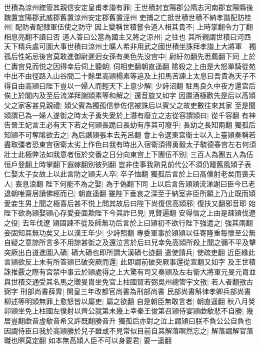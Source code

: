 世積為涼州緫管其親信安定皇甫孝諧有罪|{
	王世積封宜陽郡公隋志河南郡宜陽縣後魏置宜陽郡武威郡舊置涼州安定郡舊置涇州}
吏捕之亡抵世積世積不納孝諧配防桂州|{
	配防者配隸軍伍使之防守}
因上變稱世積嘗令道人相其貴不|{
	上時掌翻令力丁翻相息亮翻不讀曰否}
道人答曰公當為國主又將之涼州|{
	之往也}
其所親謂世積曰河西天下精兵處可圖大事世積曰涼州土曠人希非用武之國世積坐誅拜孝諧上大將軍　獨孤后性妬忌後宫莫敢進御尉遲迥女孫有美色先没宫中|{
	尉紆勿翻先悉薦翻下同}
上於仁夀宫見而悦之因得幸后伺上聽朝|{
	伺相吏翻朝直遥翻}
隂殺之上由是大怒單騎從苑中出不由徑路入山谷間二十餘里高熲楊素等追及上扣馬苦諫上太息曰吾貴為天子不得自由高熲曰陛下豈以一婦人而輕天下上意少解|{
	少詩沼翻}
駐馬良久中夜方還宫后俟上於閣内及至后流涕拜謝熲素等和解之|{
	還音旋又如字}
因置酒極歡先是后以高熲父之家客甚見親禮|{
	熲父賓為獨孤信參佐信被誅后以賓父之故吏數往來其家}
至是聞熲謂已為一婦人遂衘之時太子勇失愛於上潛有廢立之志從容謂熲曰|{
	從千容翻}
有神告晉王妃言王必有天下若之何熲長跪曰長幼有序其可廢乎|{
	長幼之長知兩翻}
獨孤后知熲不可奪隂欲去之|{
	為后譖熲張本去羌呂翻}
會上令選東宫衛士以入上臺熲奏稱若盡取彊者恐東宫宿衛太劣上作色曰我有時出入宿衛須得勇毅太子毓德春宫左右何須壯士此極弊法如我意者恒於交番之日分向東宫上下團伍不别|{
	三百人為團五人為伍恒戶登翻上時掌翻下遐嫁翻别彼列翻}
豈非佳事我熟見前代公不須仍踵舊風熲子表仁娶太子女故上以此言防之熲夫人卒|{
	卒子恤翻}
獨孤后言於上曰高僕射老矣而喪夫人|{
	喪息浪翻}
陛下何能不為之娶|{
	為于偽翻下同}
上以后言告熲熲流涕謝曰臣今已老退朝唯齋居讀佛經而已|{
	朝直遥翻}
雖陛下垂哀之深至于納室非臣所願上乃止既而熲愛妾生男上聞之極喜后甚不悦上問其故后曰陛下尚復信高熲邪|{
	復扶又翻邪音耶}
始陛下欲為熲娶熲心存愛妾面欺陛下今其詐已見|{
	見賢遍翻}
安得信之上由是疎熲伐遼之役|{
	去年伐遼}
熲固諫不從及師無功后言於上曰熲初不欲行陛下強遣之|{
	強其兩翻}
妾固知其無功矣又上以漢王年少|{
	少詩照翻}
專委軍事於熲熲以任寄隆重每懷至公無自疑之意諒所言多不用諒甚衘之及還泣言於后曰兒幸免高熲所殺上聞之彌不平及擊突厥出白道進圖入磧|{
	磧大磧也即所謂大漢磧七迹翻}
遣使請兵|{
	使疏吏翻}
近臣緣此言熲欲反上未有所答熲已破突厥而還|{
	此即謂前破突厥事還從宣翻又如字}
及王世積誅推覈之際有宫禁中事云於熲處得之上大驚有司又奏熲及左右衛大將軍元旻元胄並與世積交通受其名馬之贈旻胄坐免官上柱國賀若弼吳州總管宇文㢸|{
	若人者翻㢸古弼字}
刑部尚書薛胄|{
	開皇三年改都官尚書為刑部尚書}
民部尚書斛律孝卿兵部尚書柳述等明熲無罪上愈怒皆以屬吏|{
	屬之欲翻}
自是朝臣無敢言者|{
	朝直遥翻}
秋八月癸卯熲坐免上柱國左僕射以齊公就第未幾上幸秦王俊第召熲侍宴熲歔欷悲不自勝|{
	幾居豈翻歔音虚欷音希又許既翻勝音升}
獨孤后亦對之泣上謂熲曰朕不負公公自負也因謂侍臣曰我於高熲勝於兒子雖或不見常似目前自其解落瞑然忘之|{
	解落謂解官落職也瞑莫定翻}
如本無高熲人臣不可以身要君|{
	要一遥翻}
